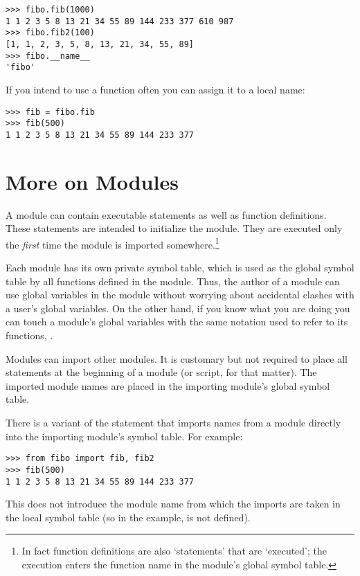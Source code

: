 \documentclass{manual}
\begin{document}
\begin{verbatim}
>>> fibo.fib(1000)
1 1 2 3 5 8 13 21 34 55 89 144 233 377 610 987
>>> fibo.fib2(100)
[1, 1, 2, 3, 5, 8, 13, 21, 34, 55, 89]
>>> fibo.__name__
'fibo'
\end{verbatim}

If you intend to use a function often you can assign it to a local name:

\begin{verbatim}
>>> fib = fibo.fib
>>> fib(500)
1 1 2 3 5 8 13 21 34 55 89 144 233 377
\end{verbatim}


\section{More on Modules \label{moreModules}}

A module can contain executable statements as well as function
definitions.
These statements are intended to initialize the module.
They are executed only the
\emph{first} time the module is imported somewhere.\footnote{
        In fact function definitions are also `statements' that are
        `executed'; the execution enters the function name in the
        module's global symbol table.
}

Each module has its own private symbol table, which is used as the
global symbol table by all functions defined in the module.
Thus, the author of a module can use global variables in the module
without worrying about accidental clashes with a user's global
variables.
On the other hand, if you know what you are doing you can touch a
module's global variables with the same notation used to refer to its
functions,
.

Modules can import other modules.  It is customary but not required to
place all  statements at the beginning of a module (or
script, for that matter).  The imported module names are placed in the
importing module's global symbol table.

There is a variant of the  statement that imports
names from a module directly into the importing module's symbol
table.  For example:

\begin{verbatim}
>>> from fibo import fib, fib2
>>> fib(500)
1 1 2 3 5 8 13 21 34 55 89 144 233 377
\end{verbatim}

This does not introduce the module name from which the imports are taken
in the local symbol table (so in the example,  is not
defined).
\end{document}
